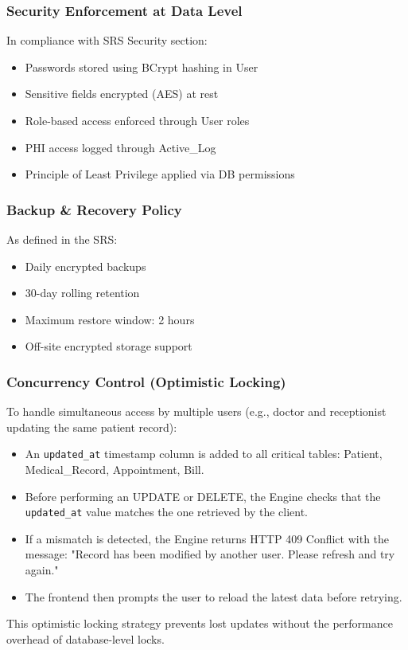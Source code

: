 \subsubsection{Security Enforcement at Data Level}
In compliance with SRS Security section:
\begin{itemize}
	\item Passwords stored using BCrypt hashing in User
	\item Sensitive fields encrypted (AES) at rest
	\item Role-based access enforced through User roles
	\item PHI access logged through Active\_Log
	\item Principle of Least Privilege applied via DB permissions
\end{itemize}

\subsubsection{Backup \& Recovery Policy}
As defined in the SRS:
\begin{itemize}
	\item Daily encrypted backups
	\item 30-day rolling retention
	\item Maximum restore window: 2 hours
	\item Off-site encrypted storage support
\end{itemize}

\subsubsection{Concurrency Control (Optimistic Locking)}
To handle simultaneous access by multiple users (e.g., doctor and receptionist updating the same patient record):
\begin{itemize}
	\item An \texttt{updated\_at} timestamp column is added to all critical tables: Patient, Medical\_Record, Appointment, Bill.
	\item Before performing an UPDATE or DELETE, the Engine checks that the \texttt{updated\_at} value matches the one retrieved by the client.
	\item If a mismatch is detected, the Engine returns HTTP 409 Conflict with the message: "Record has been modified by another user. Please refresh and try again."
	\item The frontend then prompts the user to reload the latest data before retrying.
\end{itemize}
This optimistic locking strategy prevents lost updates without the performance overhead of database-level locks.

